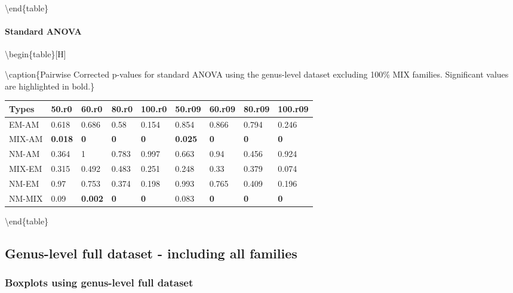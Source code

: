 \documentclass[]{article}
\let\oldparagraph\paragraph
\renewcommand{\paragraph}[1]{\oldparagraph{#1}\mbox{}}
\begin{document}
\textbackslash end\{table\}

\hypertarget{standard-anova-5}{%
\paragraph{Standard ANOVA}\label{standard-anova-5}}

\textbackslash begin\{table\}{[}H{]}

\textbackslash caption\{\label{tab:unnamed-chunk-27}Pairwise Corrected
p-values for standard ANOVA using the genus-level dataset excluding
100\% MIX families. Significant values are highlighted in bold.\}
\centering

\begin{tabular}{l|l|l|l|l|l|l|l|l}
\hline
Types & 50.r0 & 60.r0 & 80.r0 & 100.r0 & 50.r09 & 60.r09 & 80.r09 & 100.r09\\
\hline
EM-AM & 0.618 & 0.686 & 0.58 & 0.154 & 0.854 & 0.866 & 0.794 & 0.246\\
\hline
MIX-AM & \textbf{0.018} & \textbf{0} & \textbf{0} & \textbf{0} & \textbf{0.025} & \textbf{0} & \textbf{0} & \textbf{0}\\
\hline
NM-AM & 0.364 & 1 & 0.783 & 0.997 & 0.663 & 0.94 & 0.456 & 0.924\\
\hline
MIX-EM & 0.315 & 0.492 & 0.483 & 0.251 & 0.248 & 0.33 & 0.379 & 0.074\\
\hline
NM-EM & 0.97 & 0.753 & 0.374 & 0.198 & 0.993 & 0.765 & 0.409 & 0.196\\
\hline
NM-MIX & 0.09 & \textbf{0.002} & \textbf{0} & \textbf{0} & 0.083 & \textbf{0} & \textbf{0} & \textbf{0}\\
\hline
\end{tabular}

\textbackslash end\{table\}

\hypertarget{genus-level-full-dataset---including-all-families}{%
\subsection{Genus-level full dataset - including all
families}\label{genus-level-full-dataset---including-all-families}}

\hypertarget{boxplots-using-genus-level-full-dataset}{%
\subsubsection{Boxplots using genus-level full
dataset}\label{boxplots-using-genus-level-full-dataset}}
\end{document}
